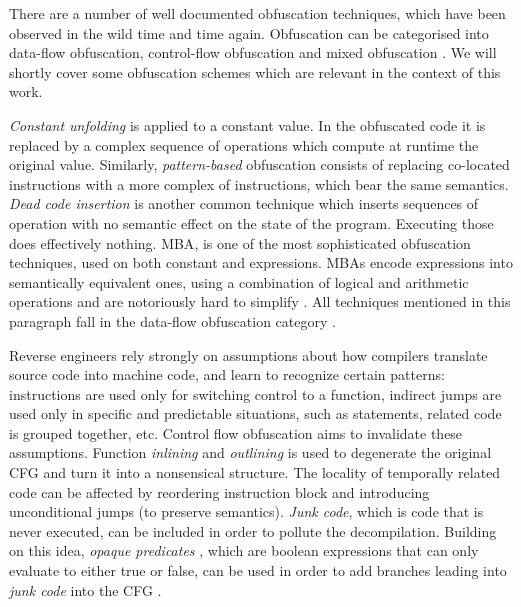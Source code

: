 There are a number of well documented obfuscation techniques, which have been observed in the wild time and time again. Obfuscation can be categorised into data-flow obfuscation, control-flow obfuscation and mixed obfuscation \cite{dang2014practical}. We will shortly cover some obfuscation schemes which are relevant in the context of this work.

\emph{Constant unfolding} is applied to a constant value. In the obfuscated code it is replaced by a complex sequence of operations which compute at runtime the original value. Similarly, \emph{pattern-based} obfuscation consists of replacing co-located instructions with a more complex of instructions, which bear the same semantics. \emph{Dead code insertion} is another common technique which inserts sequences of operation with no semantic effect on the state of the program. Executing those does effectively nothing. \gls{MBA}, is one of the most sophisticated obfuscation techniques, used on both constant and expressions. \glspl{MBA} encode expressions into semantically equivalent ones, using a combination of logical and arithmetic operations and are notoriously hard to simplify \cite{zhou2007} \cite{mba_deobf}. All techniques mentioned in this paragraph fall in the data-flow obfuscation category \cite{dang2014practical}.

Reverse engineers rely strongly on assumptions about how compilers translate source code into machine code, and learn to recognize certain patterns:  instructions are used only for switching control to a function, indirect jumps are used only in specific and predictable situations, such as  statements, related code is grouped together, etc. Control flow obfuscation aims to invalidate these assumptions. Function \emph{inlining} and \emph{outlining} is used to degenerate the original \gls{CFG} and turn it into a nonsensical structure. The locality of temporally related code can be affected by reordering instruction block and introducing unconditional jumps (to preserve semantics). \emph{Junk code}, which is code that is never executed, can be included in order to pollute the decompilation. Building on this idea, \emph{opaque predicates} \cite{collberg1997taxonomy}, which are boolean expressions that can only evaluate to either true or false, can be used in order to add branches leading into \emph{junk code} into the \gls{CFG} \cite{dang2014practical}.

